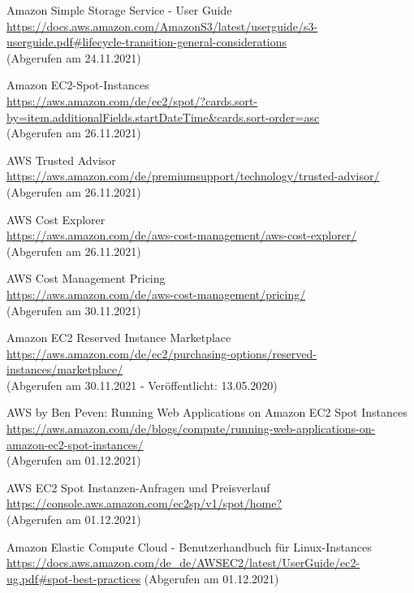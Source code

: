 \begin{thebibliography}{HR08}
 Amazon Simple Storage Service - User Guide\\
  \url{https://docs.aws.amazon.com/AmazonS3/latest/userguide/s3-userguide.pdf#lifecycle-transition-general-considerations}\\
  (Abgerufen am 24.11.2021)

 Amazon EC2-Spot-Instances\\
  \url{https://aws.amazon.com/de/ec2/spot/?cards.sort-by=item.additionalFields.startDateTime&cards.sort-order=asc}\\
  (Abgerufen am 26.11.2021)
  
    AWS Trusted Advisor\\
  \url{https://aws.amazon.com/de/premiumsupport/technology/trusted-advisor/}
  (Abgerufen am 26.11.2021)

   AWS Cost Explorer\\
  \url{https://aws.amazon.com/de/aws-cost-management/aws-cost-explorer/}\\
  (Abgerufen am 26.11.2021)

   AWS Cost Management Pricing\\
  \url{https://aws.amazon.com/de/aws-cost-management/pricing/}\\
  (Abgerufen am 30.11.2021)

 Amazon EC2 Reserved Instance Marketplace\\
  \url{https://aws.amazon.com/de/ec2/purchasing-options/reserved-instances/marketplace/}\\
  (Abgerufen am 30.11.2021 - Veröffentlicht: 13.05.2020)

 AWS by Ben Peven: Running Web Applications on Amazon EC2 Spot Instances\\
  \url{https://aws.amazon.com/de/blogs/compute/running-web-applications-on-amazon-ec2-spot-instances/}\\
  (Abgerufen am 01.12.2021)

 AWS EC2 Spot Instanzen-Anfragen und Preisverlauf\\
  \url{https://console.aws.amazon.com/ec2sp/v1/spot/home?}\\
  (Abgerufen am 01.12.2021)

 Amazon Elastic Compute Cloud - Benutzerhandbuch für Linux-Instances\\
  \url{https://docs.aws.amazon.com/de_de/AWSEC2/latest/UserGuide/ec2-ug.pdf#spot-best-practices}
  (Abgerufen am 01.12.2021)
  

\end{thebibliography}
